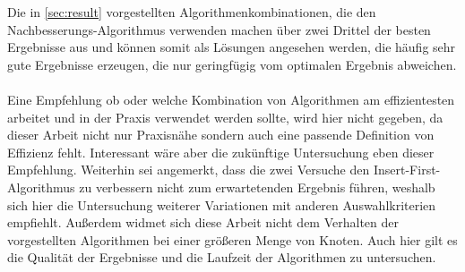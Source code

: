 Die in \vref{sec:result} vorgestellten Algorithmenkombinationen, die den Nachbesserungs-Algorithmus verwenden machen über zwei Drittel der besten Ergebnisse aus und können somit als Lösungen angesehen werden, die häufig sehr gute Ergebnisse erzeugen, die nur geringfügig vom optimalen Ergebnis abweichen.
\\\\
Eine Empfehlung ob oder welche Kombination von Algorithmen am effizientesten arbeitet und in der Praxis verwendet werden sollte, wird hier nicht gegeben, da dieser Arbeit nicht nur Praxisnähe sondern auch eine passende Definition von Effizienz fehlt.
Interessant wäre aber die zukünftige Untersuchung eben dieser Empfehlung.
Weiterhin sei angemerkt, dass die zwei Versuche den Insert-First-Algorithmus zu verbessern nicht zum erwartetenden Ergebnis führen, weshalb sich hier die Untersuchung weiterer Variationen mit anderen Auswahlkriterien empfiehlt.
Außerdem widmet sich diese Arbeit nicht dem Verhalten der vorgestellten Algorithmen bei einer größeren Menge von Knoten.
Auch hier gilt es die Qualität der Ergebnisse und die Laufzeit der Algorithmen zu untersuchen.